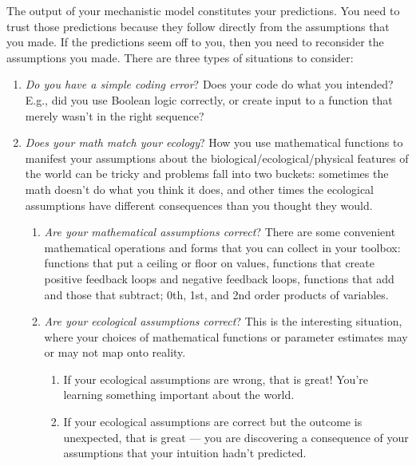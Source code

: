 \documentclass[
  letterpaper,
  DIV=11,
  numbers=noendperiod]{scrreprt}
\providecommand{\tightlist}{%
  \setlength{\itemsep}{0pt}\setlength{\parskip}{0pt}}
\begin{document}
The output of your mechanistic model constitutes your predictions. You
need to trust those predictions because they follow directly from the
assumptions that you made. If the predictions seem off to you, then you
need to reconsider the assumptions you made. There are three types of
situations to consider:

\begin{enumerate}
\def\labelenumi{\arabic{enumi}.}
\tightlist
\item
  \emph{Do you have a simple coding error}? Does your code do what you
  intended? E.g., did you use Boolean logic correctly, or create input
  to a function that merely wasn't in the right sequence?
\item
  \emph{Does your math match your ecology}? How you use mathematical
  functions to manifest your assumptions about the
  biological/ecological/physical features of the world can be tricky and
  problems fall into two buckets: sometimes the math doesn't do what you
  think it does, and other times the ecological assumptions have
  different consequences than you thought they would.

  \begin{enumerate}
  \def\labelenumii{\alph{enumii}.}
  \tightlist
  \item
    \emph{Are your mathematical assumptions correct}? There are some
    convenient mathematical operations and forms that you can collect in
    your toolbox: functions that put a ceiling or floor on values,
    functions that create positive feedback loops and negative feedback
    loops, functions that add and those that subtract; 0th, 1st, and 2nd
    order products of variables.
  \item
    \emph{Are your ecological assumptions correct}? This is the
    interesting situation, where your choices of mathematical functions
    or parameter estimates may or may not map onto reality.

    \begin{enumerate}
    \def\labelenumiii{\roman{enumiii}.}
    \tightlist
    \item
      If your ecological assumptions are wrong, that is great! You're
      learning something important about the world.
    \item
      If your ecological assumptions are correct but the outcome is
      unexpected, that is great --- you are discovering a consequence of
      your assumptions that your intuition hadn't predicted.
    \end{enumerate}
  \end{enumerate}
\end{enumerate}
\end{document}

